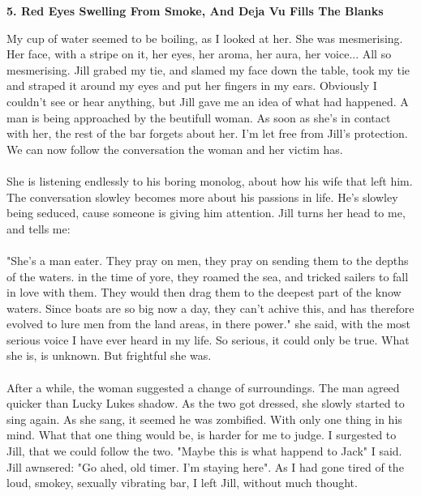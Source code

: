 \documentclass[]{article}
\begin{document}
\newpage 

\begin{center}
	\large\textbf{5. Red Eyes Swelling From Smoke, \newline And Deja Vu Fills The Blanks}
\end{center}

My cup of water seemed to be boiling, as I looked at her. She was mesmerising. Her face, with a stripe on it, her eyes, her aroma, her aura, her voice... All so mesmerising. Jill grabed my tie, and slamed my face down the table, took my tie and straped it around my eyes and put her fingers in my ears. Obviously I couldn't see or hear anything, but Jill gave me an idea of what had happened. A man is being approached by the beutifull woman. As soon as she's in contact with her, the rest of the bar forgets about her. I'm let free from Jill's protection. We can now follow the conversation the woman and her victim has.
\\ \\
She is listening endlessly to his boring monolog, about how his wife that left him. The conversation slowley becomes more about his passions in life. He's slowley being seduced, cause someone is giving him attention. Jill turns her head to me, and tells me:
\\ \\
"She's a man eater. They pray on men, they pray on sending them to the depths of the waters. in the time of yore, they roamed the sea, and tricked sailers to fall in love with them. They would then drag them to the deepest part of the know waters. Since boats are so big now a day, they can't achive this, and has therefore evolved to lure men from the land areas, in there power." she said, with the most serious voice I have ever heard in my life. So serious, it could only be true. What she is, is unknown. But frightful she was. 
\\ \\
After a while, the woman suggested a change of surroundings. The man agreed quicker than Lucky Lukes shadow. As the two got dressed, she slowly started to sing again. As she sang, it seemed he was zombified. With only one thing in his mind. What that one thing would be, is harder for me to judge. I surgested to Jill, that we could follow the two. "Maybe this is what happend to Jack" I said. Jill awnsered: "Go ahed, old timer. I'm staying here". As I had gone tired of the loud, smokey, sexually vibrating bar, I left Jill, without much thought. 
\\ \\
\end{document}
